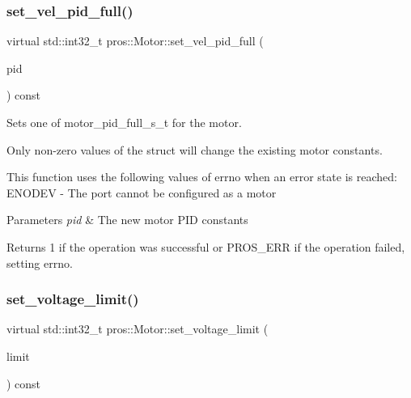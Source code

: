 \subsubsection{\texorpdfstring{set\+\_\+vel\+\_\+pid\+\_\+full()}{set\_vel\_pid\_full()}}
{\footnotesize\ttfamily virtual std\+::int32\+\_\+t pros\+::\+Motor\+::set\+\_\+vel\+\_\+pid\+\_\+full (\begin{DoxyParamCaption}\item[{const \hyperlink{motors_8h_a0295cbf49f5c70c17b5fa962bd25febd}{motor\+\_\+pid\+\_\+full\+\_\+s\+\_\+t}}]{pid }\end{DoxyParamCaption}) const\hspace{0.3cm}{\ttfamily [virtual]}}

Sets one of motor\+\_\+pid\+\_\+full\+\_\+s\+\_\+t for the motor.

Only non-\/zero values of the struct will change the existing motor constants.

This function uses the following values of errno when an error state is reached\+: E\+N\+O\+D\+EV -\/ The port cannot be configured as a motor


\begin{DoxyParams}{Parameters}
{\em pid} & The new motor P\+ID constants\\
\hline
\end{DoxyParams}
\begin{DoxyReturn}{Returns}
1 if the operation was successful or P\+R\+O\+S\+\_\+\+E\+RR if the operation failed, setting errno. 
\end{DoxyReturn}
\mbox{\label{classpros_1_1Motor_a3cd7e4ca0714b533d873796cf8b74a81}} 
\subsubsection{\texorpdfstring{set\+\_\+voltage\+\_\+limit()}{set\_voltage\_limit()}}
{\footnotesize\ttfamily virtual std\+::int32\+\_\+t pros\+::\+Motor\+::set\+\_\+voltage\+\_\+limit (\begin{DoxyParamCaption}\item[{const std\+::int32\+\_\+t}]{limit }\end{DoxyParamCaption}) const\hspace{0.3cm}{\ttfamily [virtual]}}

